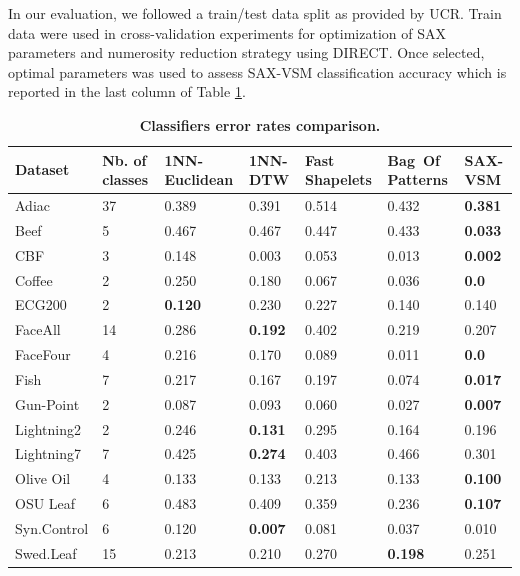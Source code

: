 \documentclass[conference]{IEEEtran}
\begin{document}
In our evaluation, we followed a train/test data split as provided by UCR. 
Train data were used in cross-validation experiments for optimization of SAX parameters 
and numerosity reduction strategy using DIRECT. 
Once selected, optimal parameters was used to assess SAX-VSM classification accuracy 
which is reported in the last column of Table \ref{perf_table}.

\begin{footnotesize}
\begin{table}[t]
\vspace{-0.3cm}
\caption{\bf Classifiers error rates comparison.}
 \label{perf_table}
\centering
\begin{tabularx}{\linewidth}{@{} l *6X @{}}
\hline
Dataset & Nb. of classes & 1NN-Euclidean & 1NN-DTW & Fast Shapelets &  \mbox{Bag Of} \mbox{Patterns}
& SAX-VSM\\
\hline
Adiac        &37  & 0.389   & 0.391  & 0.514  & 0.432  & \textbf{0.381}\\
Beef         &5   & 0.467   & 0.467  & 0.447  & 0.433  & \textbf{0.033}\\
CBF         & 3  & 0.148    & 0.003  & 0.053    & 0.013 & \textbf{0.002} \\
Coffee       &2    & 0.250   & 0.180  & 0.067     & 0.036     & \textbf{0.0} \\
ECG200     &2   & \textbf{0.120}  & 0.230  & 0.227     & 0.140   & 0.140 \\
FaceAll      &14  & 0.286   & \textbf{0.192}  & 0.402     & 0.219   & 0.207\\
FaceFour    &4   & 0.216   & 0.170  & 0.089     & 0.011   & \textbf{0.0} \\
Fish         &7   & 0.217   & 0.167  & 0.197    & 0.074   & \textbf{0.017} \\
Gun-Point    &2   & 0.087   & 0.093  & 0.060     & 0.027     & \textbf{0.007} \\
Lightning2    &2   & 0.246   & \textbf{0.131}  & 0.295  & 0.164  & 0.196 \\
Lightning7    &7   & 0.425   & \textbf{0.274}  & 0.403  & 0.466  & 0.301 \\
Olive Oil     &4   & 0.133   & 0.133  & 0.213     & 0.133  & \textbf{0.100}\\
OSU Leaf    &6   & 0.483   & 0.409  & 0.359     & 0.236  & \textbf{0.107} \\
Syn.Control  &6   & 0.120   & \textbf{0.007}  & 0.081     & 0.037  & 0.010 \\
Swed.Leaf   &15  & 0.213   & 0.210 & 0.270 & \textbf{0.198} & 0.251 \\

\end{tabularx}
\end{table}
\end{footnotesize}
\end{document}
